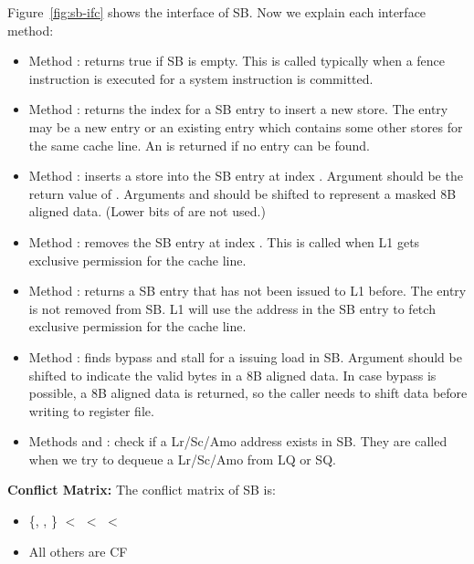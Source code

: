 Figure~\ref{fig:sb-ifc} shows the interface of SB.
Now we explain each interface method:
\begin{itemize}
    \item Method : returns true if SB is empty.
    This is called typically when a fence instruction is executed for a system instruction is committed.
    
    \item Method : returns the index for a SB entry to insert a new store.
    The entry may be a new entry or an existing entry which contains some other stores for the same cache line.
    An  is returned if no entry can be found.
    
    \item Method : inserts a store into the SB entry at index .
    Argument  should be the return value of .
    Arguments  and  should be shifted to represent a masked 8B aligned data.
    (Lower bits of  are not used.)
    
    \item Method : removes the SB entry at index .
    This is called when L1 gets exclusive permission for the cache line.
    
    \item Method : returns a SB entry that has not been issued to L1 before.
    The entry is not removed from SB.
    L1 will use the address in the SB entry to fetch exclusive permission for the cache line.
    
    \item Method : finds bypass and stall for a issuing load in SB.
    Argument  should be shifted to indicate the valid bytes in a 8B aligned data.
    In case bypass is possible, a 8B aligned data is returned, so the caller needs to shift data before writing to register file.
    
    \item Methods  and : check if a Lr/Sc/Amo address exists in SB.
    They are called when we try to dequeue a Lr/Sc/Amo from LQ or SQ.
\end{itemize}

\noindent\textbf{Conflict Matrix:}
The conflict matrix of SB is:
\begin{itemize}
    \item \{, , \} $<$  $<$  $<$ 
    \item All others are CF
\end{itemize}


